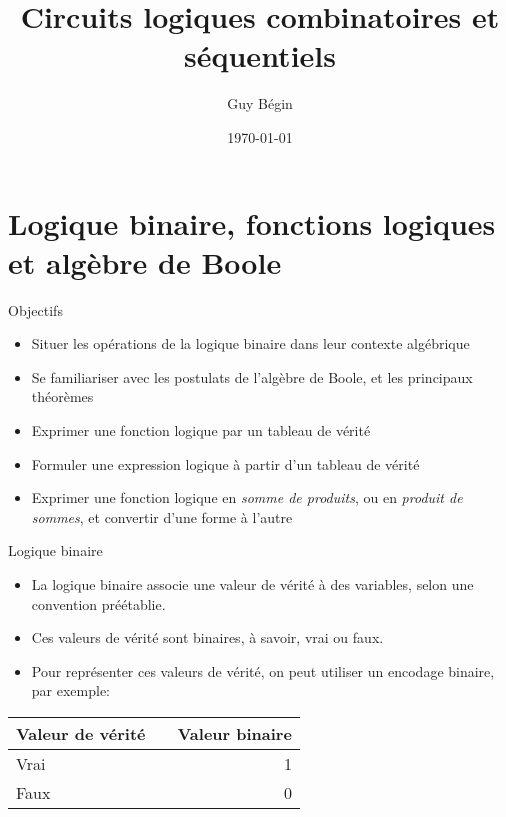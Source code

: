 \documentclass[presentation]{beamer}
\author{Guy Bégin}
\date{\today}
\title{Circuits logiques combinatoires et séquentiels}
\begin{document}
\maketitle

\section{Logique binaire, fonctions logiques et algèbre de Boole}
\label{sec:org7ee3e99}


\begin{frame}[label={sec:orgbb6b8be}]{Objectifs}
\begin{itemize}
\item Situer les opérations de la logique binaire dans leur contexte algébrique
\item Se familiariser avec les postulats de l'algèbre de Boole, et les
principaux théorèmes
\item Exprimer une fonction logique par un tableau de vérité
\item Formuler une expression logique à partir d'un tableau de vérité
\item Exprimer une fonction logique en \emph{somme de produits}, ou en
\emph{produit de sommes}, et  convertir d'une forme à l'autre
\end{itemize}
\end{frame}

\begin{frame}[label={sec:orgb6ead88}]{Logique binaire}
\begin{itemize}
\item La logique binaire associe une valeur de vérité à des variables,
selon une convention préétablie.

\item Ces valeurs de vérité sont binaires, à savoir, \alert{vrai} ou \alert{faux}.

\item Pour représenter ces valeurs de vérité, on peut utiliser un encodage
binaire,  par exemple:
\end{itemize}

\begin{center}
\begin{tabular}{llr}
Valeur de vérité &  & Valeur binaire\\[0pt]
\hline
Vrai &  & 1\\[0pt]
Faux &  & 0\\[0pt]
\end{tabular}
\end{center}
\end{frame}
\end{document}
